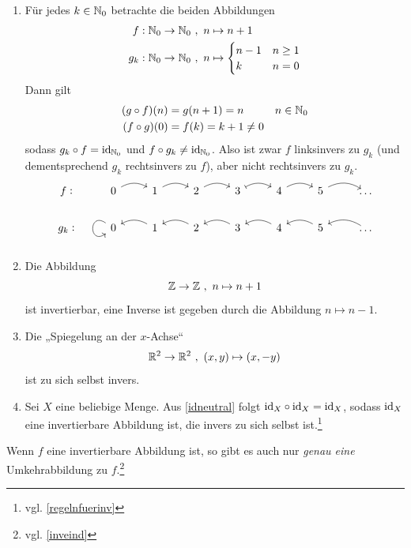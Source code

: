 \begin{bsp} \label{bsp:umkehrabb} \qquad
    \begin{enumerate}
        \item Für jedes $k\in \mathbb N_0$ betrachte die beiden Abbildungen
        \begin{align*}
            f:\mathbb N_0 \to \mathbb N_0 \ &,\ n \mapsto n+1 \\
            g_k: \mathbb N_0 \to \mathbb N_0\ &,\ n \mapsto \begin{cases}
                n-1 & n\ge 1 \\
                k & n=0
            \end{cases}
        \end{align*}
        Dann gilt
        \begin{align*}
            (g\circ f)(n)&=g(n+1)=n && n\in \mathbb N_0 \\
            (f\circ g)(0) & = f(k) = k+1 \neq 0
        \end{align*}
        sodass $g_k\circ f=\mathrm{id}_{\mathbb N_0}$ und $f\circ g_k\neq \mathrm{id}_{\mathbb N_0}$. Also ist zwar $f$ linksinvers zu $g_k$ (und dementsprechend $g_k$ rechtsinvers zu $f$), aber nicht rechtsinvers zu $g_k$.
        \[\begin{tikzcd}
            f\vcentcolon & 0 \ar[r, bend left]& 1 \ar[r, bend left]& 2 \ar[r, bend left]& 3 \ar[r, bend left, mapsto]& 4 \ar[r, bend left]& 5 \ar[r, bend left]& \dots \\
            g_k\vcentcolon & 0 \ar[loop, out=145, in=215, looseness=5] & 1 \ar[l, bend right] & 2 \ar[l, bend right] & 3 \ar[l, bend right] & 4  \ar[l, bend right] & 5  \ar[l, bend right] &  \ar[l, bend right]  \dots
        \end{tikzcd}\]
        \item Die Abbildung
            \[ \mathbb Z\to \mathbb Z \ ,\ n\mapsto n+1 \]
        ist invertierbar, eine Inverse ist gegeben durch die Abbildung $n\mapsto n-1$.
        \item Die „Spiegelung an der $x$-Achse“
        \[ \mathbb R^2 \to \mathbb R^2 \ ,\ (x,y) \mapsto (x,-y) \]
        ist zu sich selbst invers.
        \item Sei $X$ eine beliebige Menge. Aus \cref{idneutral} folgt $\mathrm{id}_X\circ \mathrm{id}_X=\mathrm{id}_X$, sodass $\mathrm{id}_X$ eine invertierbare Abbildung ist, die invers zu sich selbst ist.\footnote{vgl. \cref{regelnfuerinv}}
    \end{enumerate}
\end{bsp}


\begin{satz}\label{umkehreind}
    Wenn $f$ eine invertierbare Abbildung ist, so gibt es auch nur \emph{genau eine} Umkehrabbildung zu $f$.\footnote{vgl. \cref{inveind}}
\end{satz}


